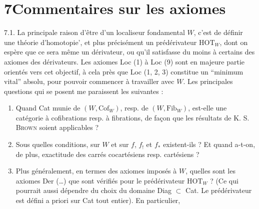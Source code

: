 \documentclass[11pt]{article}
\newcommand{\msp}[1]{\marginpar{\footnotesize [#1]}}
\begin{document}
\msp{page 97}

\section*{7\quad Commentaires sur les axiomes}

7.1. La principale raison d'être d'un localiseur fondamental $W$, c'est de définir une théorie d'homotopie’, et plus précisément un prédérivateur $\mathrm{HOT}_W$, dont on espère que ce sera même un dérivateur, ou qu'il satisfasse du moins à certains des axiomes des dérivateurs. Les axiomes Loc (1) à Loc (9) sont en majeure partie orientés vers cet objectif, à cela près que Loc (1, 2, 3) constitue un “minimum vital” absolu, pour pouvoir commencer à travailler avec $W$. Les principales questions qui se posent me paraissent les suivantes : %
\begin{enumerate}[label={}, leftmargin=2.5em]
\item[1)] Quand Cat munie de $(W, \mathrm{Cof}_W)$, resp. de $(W, \mathrm{Fib}_W)$, est-elle une catégorie à cofibrations resp. à fibrations, de façon que les résultats de K. S. \textsc{Brown} soient applicables ?
\item[2)] Sous quelles conditions, sur $W$ et sur $f$, $f_!$ et $f_*$ existent-ils ? Et quand a-t-on, de plus, exactitude des carrés cocartésiens resp. cartésiens ?

\msp{page 98}
\item[3)] Plus généralement, en termes des axiomes imposés à $W$, quelles sont les axiomes Der (\ldots) que sont vérifiés pour le prédérivateur $\mathrm{HOT}_W$ ? (Ce qui pourrait aussi dépendre du choix du domaine Diag $\subset$ Cat. Le prédérivateur est défini a priori sur Cat tout entier). En particulier, %
\end{enumerate}
\end{document}
